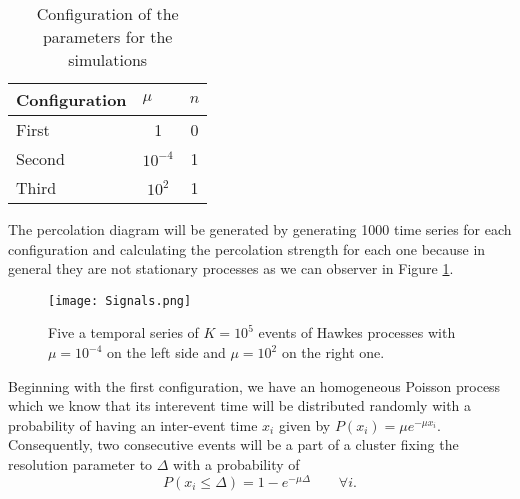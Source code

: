 \begin{table}[H]
    \centering
    \caption{Configuration of the parameters for the simulations}
    \label{tab: parameters}
    \begin{tabular}{@{}lcc@{}}
    \toprule
    Configuration & \multicolumn{1}{l}{$\mu$} & \multicolumn{1}{l}{$n$} \\ \midrule
    First & 1 & 0 \\
    Second & $10^{-4}$ & 1 \\
    Third & $10^2$ & 1 \\ \bottomrule
    \end{tabular}
\end{table}

The percolation diagram will be generated by generating 1000 time series for each configuration and calculating the percolation strength for each one because in general they are not stationary
processes as we can observer in Figure \ref{f: Hawkes not stationary}.

\begin{figure}[H]
    \centering
    \texttt{[image: Signals.png]}
    \caption{Five a temporal series of $K=10^5$ events of Hawkes processes with $\mu=10^{-4}$ on the left side and $\mu = 10^2$ on the right one.}
    \label{f: Hawkes not stationary}
\end{figure}

Beginning with the first configuration, we have an homogeneous Poisson process which we know that its interevent time will be distributed randomly with a probability of having an inter-event
time $x_i$ given by $P(x_i)=\mu e^{-\mu x_i}$. Consequently, two consecutive events will be a part of a cluster fixing the resolution parameter to $\Delta$ with a probability of
\begin{equation}
    P(x_i\leq \Delta)=1-e^{-\mu\Delta}\quad\quad \forall i.
    \label{eq: Poisson prob of cluster of size 2}
\end{equation}

